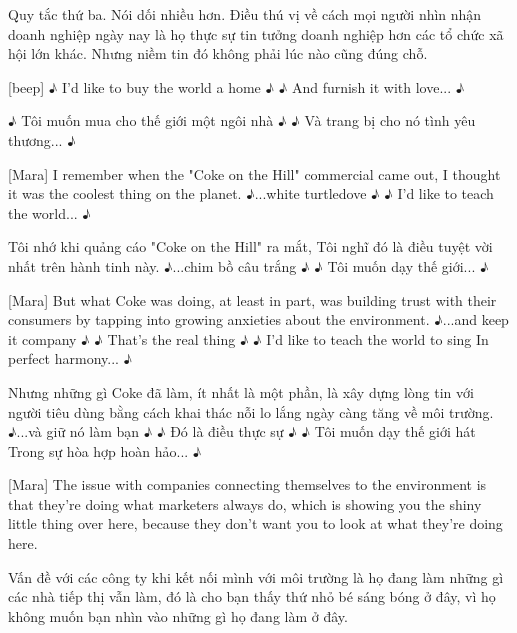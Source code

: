 \documentclass[a4paper]{article}
\begin{document}
	\begin{vietnamese-v2}
		[vỗ tay]
		Quy tắc thứ ba. Nói dối nhiều hơn.
		Điều thú vị về cách mọi người nhìn nhận doanh nghiệp ngày nay là họ thực sự tin tưởng doanh nghiệp hơn các tổ chức xã hội lớn khác.
		Nhưng niềm tin đó không phải lúc nào cũng đúng chỗ.
	\end{vietnamese-v2}
	
	[beep]
	♪ I'd like to buy the world a home ♪
	♪ And furnish it with love... ♪
	
	\begin{vietnamese-v2}
		[bíp]
		♪ Tôi muốn mua cho thế giới một ngôi nhà ♪
		♪ Và trang bị cho nó tình yêu thương... ♪
	\end{vietnamese-v2}
	
	[Mara] I remember when the "Coke on the Hill" commercial came out,
	I thought it was the coolest thing on the planet.
	♪...white turtledove ♪
	♪ I'd like to teach the world... ♪
	
	\begin{vietnamese-v2}
		[Mara] Tôi nhớ khi quảng cáo "Coke on the Hill" ra mắt,
		Tôi nghĩ đó là điều tuyệt vời nhất trên hành tinh này.
		♪...chim bồ câu trắng ♪
		♪ Tôi muốn dạy thế giới... ♪
	\end{vietnamese-v2}
	
	[Mara] But what Coke was doing, at least in part, was building trust with their consumers by tapping into growing anxieties about the environment.
	♪...and keep it company ♪
	♪ That's the real thing ♪
	♪ I'd like to teach the world to sing In perfect harmony... ♪
	
	\begin{vietnamese-v2}
		[Mara] Nhưng những gì Coke đã làm, ít nhất là một phần, là xây dựng lòng tin với người tiêu dùng bằng cách khai thác nỗi lo lắng ngày càng tăng về môi trường.
		♪...và giữ nó làm bạn ♪
		♪ Đó là điều thực sự ♪
		♪ Tôi muốn dạy thế giới hát Trong sự hòa hợp hoàn hảo... ♪
	\end{vietnamese-v2}
	
	[Mara] The issue with companies connecting themselves to the environment is that they're doing what marketers always do, which is showing you the shiny little thing over here, because they don't want you to look at what they're doing here.
	
	\begin{vietnamese-v2}
		[Mara] Vấn đề với các công ty khi kết nối mình với môi trường là họ đang làm những gì các nhà tiếp thị vẫn làm, đó là cho bạn thấy thứ nhỏ bé sáng bóng ở đây, vì họ không muốn bạn nhìn vào những gì họ đang làm ở đây.
	\end{vietnamese-v2}
	
\end{document}
